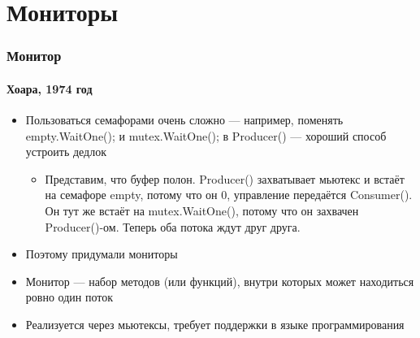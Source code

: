 \documentclass{../../slides-style}
\begin{document}
    \section{Мониторы}

    \begin{frame}
        \frametitle{Монитор}
        \framesubtitle{Хоара, 1974 год}
        \begin{itemize}
            \item Пользоваться семафорами очень сложно --- например, поменять empty.WaitOne(); и mutex.WaitOne(); в Producer() --- хороший способ устроить дедлок
            \begin{itemize}
                \item Представим, что буфер полон. Producer() захватывает мьютекс и встаёт на семафоре empty, потому что он 0, управление передаётся Consumer(). Он тут же встаёт на mutex.WaitOne(), потому что он захвачен Producer()-ом. Теперь оба потока ждут друг друга.
            \end{itemize}
            \item Поэтому придумали мониторы
            \item Монитор --- набор методов (или функций), внутри которых может находиться ровно один поток
            \item Реализуется через мьютексы, требует поддержки в языке программирования
        \end{itemize}
    \end{frame}
\end{document}
